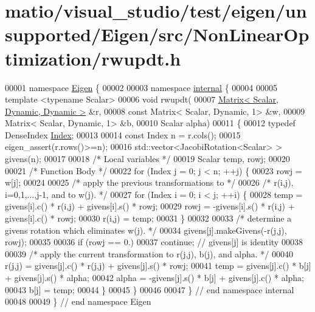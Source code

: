 \hypertarget{matio_2visual__studio_2test_2eigen_2unsupported_2_eigen_2src_2_non_linear_optimization_2rwupdt_8h_source}{}\section{matio/visual\+\_\+studio/test/eigen/unsupported/\+Eigen/src/\+Non\+Linear\+Optimization/rwupdt.h}
\label{matio_2visual__studio_2test_2eigen_2unsupported_2_eigen_2src_2_non_linear_optimization_2rwupdt_8h_source}

\begin{DoxyCode}
00001 \textcolor{keyword}{namespace }\hyperlink{namespace_eigen}{Eigen} \{ 
00002 
00003 \textcolor{keyword}{namespace }\hyperlink{namespaceinternal}{internal} \{
00004 
00005 \textcolor{keyword}{template} <\textcolor{keyword}{typename} Scalar>
00006 \textcolor{keywordtype}{void} rwupdt(
00007         \hyperlink{group___core___module}{Matrix< Scalar, Dynamic, Dynamic >}  &r,
00008         \textcolor{keyword}{const} Matrix< Scalar, Dynamic, 1>  &w,
00009         Matrix< Scalar, Dynamic, 1>  &b,
00010         Scalar alpha)
00011 \{
00012     \textcolor{keyword}{typedef} DenseIndex \hyperlink{namespace_eigen_a62e77e0933482dafde8fe197d9a2cfde}{Index};
00013 
00014     \textcolor{keyword}{const} Index n = r.cols();
00015     eigen\_assert(r.rows()>=n);
00016     std::vector<JacobiRotation<Scalar> > givens(n);
00017 
00018     \textcolor{comment}{/* Local variables */}
00019     Scalar temp, rowj;
00020 
00021     \textcolor{comment}{/* Function Body */}
00022     \textcolor{keywordflow}{for} (Index j = 0; j < n; ++j) \{
00023         rowj = w[j];
00024 
00025         \textcolor{comment}{/* apply the previous transformations to */}
00026         \textcolor{comment}{/* r(i,j), i=0,1,...,j-1, and to w(j). */}
00027         \textcolor{keywordflow}{for} (Index i = 0; i < j; ++i) \{
00028             temp = givens[i].c() * r(i,j) + givens[i].s() * rowj;
00029             rowj = -givens[i].s() * r(i,j) + givens[i].c() * rowj;
00030             r(i,j) = temp;
00031         \}
00032 
00033         \textcolor{comment}{/* determine a givens rotation which eliminates w(j). */}
00034         givens[j].makeGivens(-r(j,j), rowj);
00035 
00036         \textcolor{keywordflow}{if} (rowj == 0.)
00037             \textcolor{keywordflow}{continue}; \textcolor{comment}{// givens[j] is identity}
00038 
00039         \textcolor{comment}{/* apply the current transformation to r(j,j), b(j), and alpha. */}
00040         r(j,j) = givens[j].c() * r(j,j) + givens[j].s() * rowj;
00041         temp = givens[j].c() * b[j] + givens[j].s() * alpha;
00042         alpha = -givens[j].s() * b[j] + givens[j].c() * alpha;
00043         b[j] = temp;
00044     \}
00045 \}
00046 
00047 \} \textcolor{comment}{// end namespace internal}
00048 
00049 \} \textcolor{comment}{// end namespace Eigen}
\end{DoxyCode}
